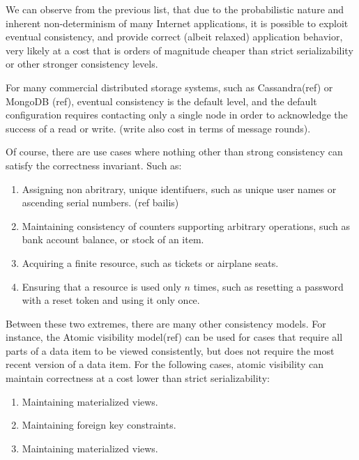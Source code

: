 We can observe from the previous list, that due to the probabilistic nature and 
inherent non-determinism of many Internet applications, it is possible to exploit 
eventual consistency, and provide correct (albeit relaxed) application behavior, 
very likely at a cost that is orders of magnitude cheaper than strict serializability 
or other stronger consistency levels. 

For many commercial distributed storage
systems, such as Cassandra(ref) or MongoDB (ref), eventual consistency is the default
level, and the default configuration requires contacting only a single node in
order to acknowledge the success of a read or write. (write also cost in terms
of message rounds).

Of course, there are use cases where nothing other than strong consistency can
satisfy the correctness invariant. Such as:

\begin{enumerate}

\item Assigning non abritrary, unique identifuers, such as unique user names or
ascending serial numbers. (ref bailis)

\item Maintaining consistency of counters supporting arbitrary operations, such
as bank account balance, or stock of an item. 

\item Acquiring a finite resource, such as tickets or airplane seats. 

\item Ensuring that a resource is used only $n$ times, such as resetting a
password with a reset token and using it only once. 
\end{enumerate}

 Between these two extremes, there are many other consistency models. For
 instance, the Atomic visibility model(ref) can be used for cases that
 require all parts of a data item to be viewed consistently, but does not require
 the most recent version of a data item. For the following cases, 
 atomic visibility can maintain correctness at a cost lower than strict
 serializability: 
\begin{enumerate}
\item Maintaining materialized views.
\item Maintaining foreign key constraints.
\item Maintaining materialized views.
\end{enumerate}

